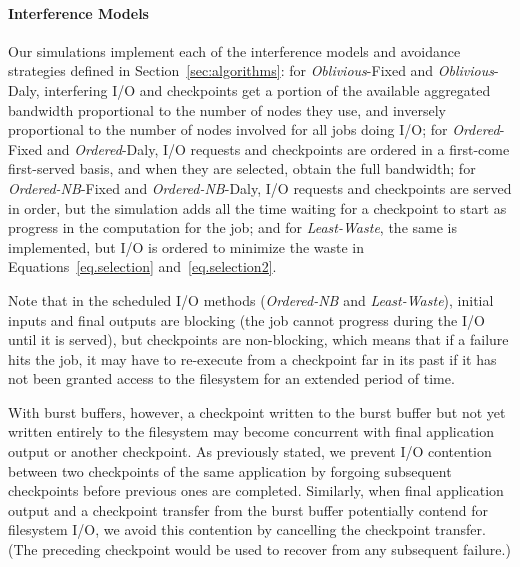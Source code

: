 \documentclass[two]{article}
\newcommand{\nocoop}{\emph{Oblivious}\xspace}
\newcommand{\fifoblock}{\emph{Ordered}\xspace}
\newcommand{\fifononblock}{\emph{Ordered-NB}\xspace}
\newcommand{\leastwaste}{\emph{Least-Waste}\xspace}
\def\propfixed{\nocoop-Fixed\xspace}
\def\propdaly{\nocoop-Daly\xspace}
\def\bfifofixed{\fifoblock-Fixed\xspace}
\def\bfifodaly{\fifoblock-Daly\xspace}
\def\fifofixed{\fifononblock-Fixed\xspace}
\def\fifodaly{\fifononblock-Daly\xspace}
\def\cooperative{\leastwaste}
\begin{document}
\paragraph*{Interference Models} Our simulations implement each of the
interference models and avoidance strategies defined in
Section~\ref{sec:algorithms}: for \propfixed and \propdaly,
interfering I/O and checkpoints get a portion of the available
aggregated bandwidth proportional to the number of nodes they use, and
inversely proportional to the number of nodes involved for all
jobs doing I/O; for \bfifofixed and \bfifodaly, I/O requests
and checkpoints are ordered in a first-come first-served basis, and
when they are selected, obtain the full bandwidth; for \fifofixed and
\fifodaly, I/O requests and checkpoints are served in order, but the
simulation adds all the time waiting for a checkpoint to start as
progress in the computation for the job; and for \cooperative,
the same is implemented, but I/O is ordered to minimize the waste in
Equations~\eqref{eq.selection} and~\eqref{eq.selection2}.

Note that in the scheduled I/O methods (\fifononblock and \cooperative),
initial inputs and final outputs are blocking (the job cannot progress during
the I/O until it is served), but checkpoints are non-blocking, which means that
if a failure hits the job, it may have to re-execute from a checkpoint far in
its past if it has  not been granted access to the filesystem for an extended
period of time.

With burst buffers, however, a checkpoint written to the burst buffer but not yet
written entirely to the filesystem may become concurrent with final application
output or another checkpoint.  As previously stated, we prevent I/O contention
between two checkpoints of the same application by forgoing subsequent checkpoints
before previous ones are completed.
Similarly, when final application output and a checkpoint transfer from the burst
buffer potentially contend for filesystem I/O, we avoid this contention by cancelling
the checkpoint transfer. (The preceding checkpoint would be used to recover from any
subsequent failure.)
\end{document}
